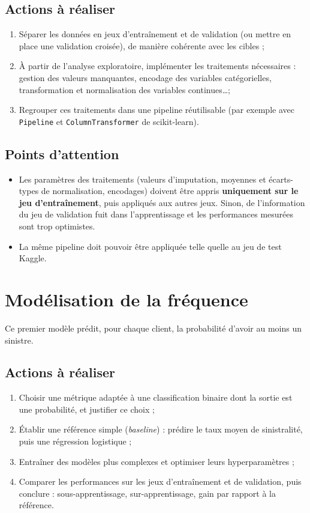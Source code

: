 \documentclass[a4paper,11pt]{article}
\begin{document}
	\subsection*{Actions à réaliser}
	\begin{enumerate}
		\item Séparer les données en jeux d'entraînement et de validation (ou mettre en place une validation croisée), de manière cohérente avec les cibles ;
		\item À partir de l'analyse exploratoire, implémenter les traitements nécessaires : gestion des valeurs manquantes, encodage des variables catégorielles, transformation et normalisation des variables continues\dots ;
		\item Regrouper ces traitements dans une pipeline réutilisable (par exemple avec \texttt{Pipeline} et \texttt{ColumnTransformer} de scikit-learn).
	\end{enumerate}
	
	\subsection*{Points d'attention}
	\begin{itemize}
		\item Les paramètres des traitements (valeurs d'imputation, moyennes et écarts-types de normalisation, encodages) doivent être appris \textbf{uniquement sur le jeu d'entraînement}, puis appliqués aux autres jeux. Sinon, de l'information du jeu de validation fuit dans l'apprentissage et les performances mesurées sont trop optimistes.
		\item La même pipeline doit pouvoir être appliquée telle quelle au jeu de test Kaggle.
	\end{itemize}
	
	\section{Modélisation de la fréquence}
	
	Ce premier modèle prédit, pour chaque client, la probabilité d'avoir au moins un sinistre.
	
	\subsection*{Actions à réaliser}
	\begin{enumerate}
		\item Choisir une métrique adaptée à une classification binaire dont la sortie est une probabilité, et justifier ce choix ;
		\item Établir une référence simple (\emph{baseline}) : prédire le taux moyen de sinistralité, puis une régression logistique ;
		\item Entraîner des modèles plus complexes et optimiser leurs hyperparamètres ;
		\item Comparer les performances sur les jeux d'entraînement et de validation, puis conclure : sous-apprentissage, sur-apprentissage, gain par rapport à la référence.
	\end{enumerate}
	
\end{document}

